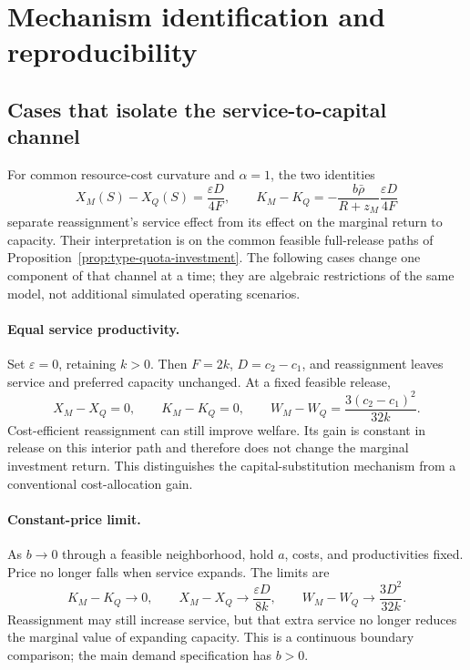 \section{Mechanism identification and reproducibility}\label{app:current-audit}

\subsection{Cases that isolate the service-to-capital channel}\label{app:mechanism-cases}

For common resource-cost curvature and $\alpha=1$, the two identities
\[
X_M(S)-X_Q(S)=\frac{\varepsilon D}{4F},\qquad
K_M-K_Q=-\frac{b\bar\rho}{R+z_M}\frac{\varepsilon D}{4F}
\]
separate reassignment's service effect from its effect on the marginal return to capacity. Their interpretation is on the common feasible full-release paths of Proposition~\ref{prop:type-quota-investment}. The following cases change one component of that channel at a time; they are algebraic restrictions of the same model, not additional simulated operating scenarios.

\paragraph{Equal service productivity.}
Set $\varepsilon=0$, retaining $k>0$. Then $F=2k$, $D=c_2-c_1$, and reassignment leaves service and preferred capacity unchanged. At a fixed feasible release,
\begin{equation}
X_M-X_Q=0,\qquad K_M-K_Q=0,\qquad
W_M-W_Q=\frac{3(c_2-c_1)^2}{32k}.
\label{eq:mechanism-equal-productivity}
\end{equation}
Cost-efficient reassignment can still improve welfare. Its gain is constant in release on this interior path and therefore does not change the marginal investment return. This distinguishes the capital-substitution mechanism from a conventional cost-allocation gain.

\paragraph{Constant-price limit.}
As $b\to0$ through a feasible neighborhood, hold $a$, costs, and productivities fixed. Price no longer falls when service expands. The limits are
\begin{equation}
K_M-K_Q\to0,\qquad
X_M-X_Q\to\frac{\varepsilon D}{8k},\qquad
W_M-W_Q\to\frac{3D^2}{32k}.
\label{eq:mechanism-constant-price}
\end{equation}
Reassignment may still increase service, but that extra service no longer reduces the marginal value of expanding capacity. This is a continuous boundary comparison; the main demand specification has $b>0$.

